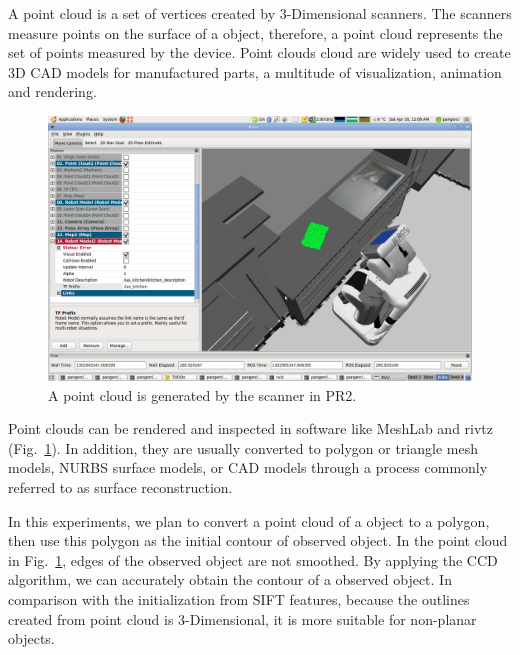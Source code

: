 A point cloud is a set of vertices created by 3-Dimensional
scanners. The scanners measure points on the surface of a object,
therefore, a point cloud represents the set of points measured by the
device. Point clouds cloud are widely used to  create 3D CAD models
for manufactured parts, a multitude of visualization, animation and
rendering.
\begin{figure}[htb]
  \centering
  \includegraphics[width=\linewidth]{images/pr2b.png}
  \caption[Point cloud of a book rendered in rivz]{A point cloud is
    generated by the scanner in PR2.}
  \label{fig:pointcloud}
\end{figure}

Point clouds can be rendered and inspected in software like MeshLab
and rivtz (Fig.~\ref{fig:pointcloud}). In addition, they are usually converted to polygon or
triangle mesh models, NURBS surface models, or CAD models through a
process commonly referred to as surface reconstruction.

In this experiments, we plan to convert a point cloud of a object to a
polygon, then use this polygon as the initial contour of observed
object. In the point cloud in Fig.~\ref{fig:pointcloud}, edges of
the observed object are not smoothed. By applying the CCD algorithm,
we can accurately obtain the contour of a observed object. In
comparison with the initialization from SIFT features, because the
outlines created from point cloud is 3-Dimensional, it is more
suitable for non-planar objects.
